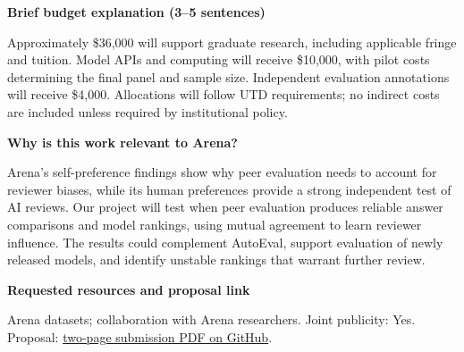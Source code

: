 \documentclass[12pt,letterpaper]{article}
\newcommand{\formq}[1]{\par\addvspace{5pt}\noindent\textbf{#1}\par\nopagebreak\noindent\ignorespaces}
\begin{document}
\formq{Brief budget explanation (3--5 sentences)}
Approximately \$36,000 will support graduate research, including applicable fringe and tuition. Model APIs and computing will receive \$10,000, with pilot costs determining the final panel and sample size. Independent evaluation annotations will receive \$4,000. Allocations will follow UTD requirements; no indirect costs are included unless required by institutional policy.

\formq{Why is this work relevant to Arena?}
Arena's self-preference findings show why peer evaluation needs to account for reviewer biases, while its human preferences provide a strong independent test of AI reviews. Our project will test when peer evaluation produces reliable answer comparisons and model rankings, using mutual agreement to learn reviewer influence. The results could complement AutoEval, support evaluation of newly released models, and identify unstable rankings that warrant further review.

\formq{Requested resources and proposal link}
Arena datasets; collaboration with Arena researchers. Joint publicity: Yes. Proposal: \href{https://github.com/xinyadu/YIP-Proposal/blob/main/arena/Arena_Proposal_2page.pdf}{two-page submission PDF on GitHub}.
\fi
\end{document}
